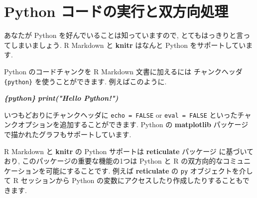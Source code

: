 \documentclass[
  11pt,
  lualatex,
  ja=standard]{bxjsreport}
\newenvironment{Shaded}{\begin{snugshade}}{\end{snugshade}}
\newcommand{\InformationTok}[1]{\textcolor[rgb]{0.56,0.35,0.01}{\textbf{\textit{#1}}}}
\begin{document}
\hypertarget{eng-python}{%
\section{Python コードの実行と双方向処理}\label{eng-python}}

あなたが Python を好んでいることは知っていますので, とてもはっきりと言ってしまいましょう. R Markdown と \textbf{knitr} はなんと Python をサポートしています.

Python のコードチャンクを R Markdown 文書に加えるには チャンクヘッダ \texttt{\textasciigrave{}\textasciigrave{}\textasciigrave{}\{python\}} を使うことができます. 例えばこのように.

\begin{Shaded}
\begin{Highlighting}[]
\InformationTok{\textasciigrave{}\textasciigrave{}\textasciigrave{}\{python\}}
\InformationTok{print("Hello Python!")}
\InformationTok{\textasciigrave{}\textasciigrave{}\textasciigrave{}}
\end{Highlighting}
\end{Shaded}

いつもどおりにチャンクヘッダに \texttt{echo = FALSE} or \texttt{eval = FALSE} といったチャンクオプションを追加することができます. Python の \textbf{matplotlib} パッケージで描かれたグラフもサポートしています.

R Markdown と \textbf{knitr} の Python サポートは \textbf{reticulate} パッケージ \autocite{R-reticulate} に基づいており, このパッケージの重要な機能の1つは Python と R の双方向的なコミュニケーションを可能にすることです. 例えば \textbf{reticulate} の \texttt{py} オブジェクトを介して R セッションから Python の変数にアクセスしたり作成したりすることもできます.
\end{document}
